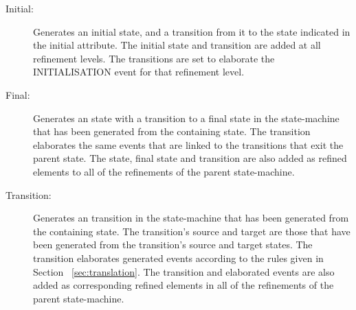 \begin{description}
\item[Initial:] Generates an \UMLB initial state, and a transition from it to the \UMLB state indicated in the \SCXML initial attribute. 
The \UMLB initial state and \UMLB transition are added at all refinement levels. The \UMLB transitions are set to elaborate the \EventB INITIALISATION event for that refinement level.

\item[Final:] Generates an \UMLB state with a transition to a final state in the state-machine that has been generated from the containing \SCXML state. 
The transition elaborates the same events that are linked to the transitions that exit the parent \UMLB state. 
The \UMLB state, final state and transition are also added as refined elements to all of the refinements of the parent \UMLB state-machine.

\item[Transition:] Generates an \UMLB transition in the state-machine that has been generated from the containing \SCXML state. 
The \UMLB transition’s source and target are those that have been generated from the \SCXML transition’s source and target states. 
The transition elaborates generated \EVENTB events according to the rules given in Section ~\ref{sec:translation}. 
The \UMLB transition and elaborated \EVENTB events are also added as corresponding refined elements in all of the refinements of the parent \UMLB state-machine.


\end{description}



